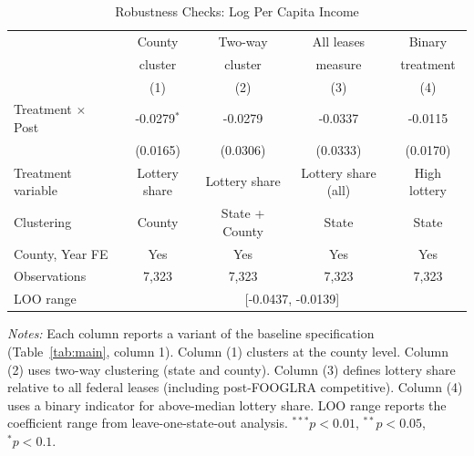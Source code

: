 \begin{table}[htbp]
\centering
\caption{Robustness Checks: Log Per Capita Income}
\label{tab:robust}
\begin{tabular}{lcccc}
\hline\hline
 & County & Two-way & All leases & Binary \\
 & cluster & cluster & measure & treatment \\
 & (1) & (2) & (3) & (4) \\
\hline
Treatment $\times$ Post & -0.0279$^{*}$ & -0.0279 & -0.0337 & -0.0115 \\
 & (0.0165) & (0.0306) & (0.0333) & (0.0170) \\
\addlinespace
Treatment variable & Lottery share & Lottery share & Lottery share (all) & High lottery \\
Clustering & County & State + County & State & State \\
County, Year FE & Yes & Yes & Yes & Yes \\
Observations & 7,323 & 7,323 & 7,323 & 7,323 \\
\addlinespace
LOO range & \multicolumn{4}{c}{[-0.0437, -0.0139]} \\
\hline\hline
\end{tabular}
\vspace{0.5em}\begin{flushleft}\small
\textit{Notes:} Each column reports a variant of the baseline specification (Table~\ref{tab:main}, column 1). Column (1) clusters at the county level. Column (2) uses two-way clustering (state and county). Column (3) defines lottery share relative to all federal leases (including post-FOOGLRA competitive). Column (4) uses a binary indicator for above-median lottery share. LOO range reports the coefficient range from leave-one-state-out analysis. $^{***}p<0.01$, $^{**}p<0.05$, $^{*}p<0.1$.
\end{flushleft}
\end{table}

